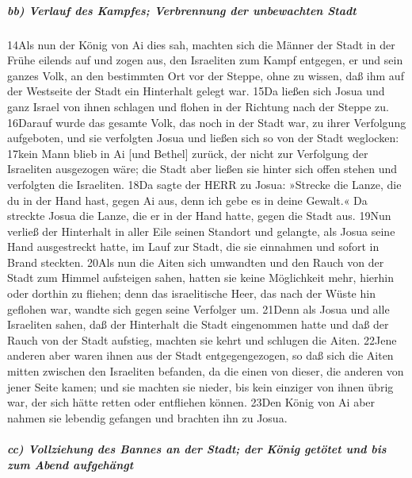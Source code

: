 \hypertarget{bb-verlauf-des-kampfes-verbrennung-der-unbewachten-stadt}{%
\subparagraph{bb) Verlauf des Kampfes; Verbrennung der unbewachten
Stadt}\label{bb-verlauf-des-kampfes-verbrennung-der-unbewachten-stadt}}

14Als nun der König von Ai dies sah, machten sich die Männer der Stadt
in der Frühe eilends auf und zogen aus, den Israeliten zum Kampf
entgegen, er und sein ganzes Volk, an den bestimmten Ort vor der Steppe,
ohne zu wissen, daß ihm auf der Westseite der Stadt ein Hinterhalt
gelegt war. 15Da ließen sich Josua und ganz Israel von ihnen schlagen
und flohen in der Richtung nach der Steppe zu. 16Darauf wurde das
gesamte Volk, das noch in der Stadt war, zu ihrer Verfolgung aufgeboten,
und sie verfolgten Josua und ließen sich so von der Stadt weglocken:
17kein Mann blieb in Ai {[}und Bethel{]} zurück, der nicht zur
Verfolgung der Israeliten ausgezogen wäre; die Stadt aber ließen sie
hinter sich offen stehen und verfolgten die Israeliten. 18Da sagte der
HERR zu Josua: »Strecke die Lanze, die du in der Hand hast, gegen Ai
aus, denn ich gebe es in deine Gewalt.« Da streckte Josua die Lanze, die
er in der Hand hatte, gegen die Stadt aus. 19Nun verließ der Hinterhalt
in aller Eile seinen Standort und gelangte, als Josua seine Hand
ausgestreckt hatte, im Lauf zur Stadt, die sie einnahmen und sofort in
Brand steckten. 20Als nun die Aiten sich umwandten und den Rauch von der
Stadt zum Himmel aufsteigen sahen, hatten sie keine Möglichkeit mehr,
hierhin oder dorthin zu fliehen; denn das israelitische Heer, das nach
der Wüste hin geflohen war, wandte sich gegen seine Verfolger um. 21Denn
als Josua und alle Israeliten sahen, daß der Hinterhalt die Stadt
eingenommen hatte und daß der Rauch von der Stadt aufstieg, machten sie
kehrt und schlugen die Aiten. 22Jene anderen aber waren ihnen aus der
Stadt entgegengezogen, so daß sich die Aiten mitten zwischen den
Israeliten befanden, da die einen von dieser, die anderen von jener
Seite kamen; und sie machten sie nieder, bis kein einziger von ihnen
übrig war, der sich hätte retten oder entfliehen können. 23Den König von
Ai aber nahmen sie lebendig gefangen und brachten ihn zu Josua.

\hypertarget{cc-vollziehung-des-bannes-an-der-stadt-der-kuxf6nig-getuxf6tet-und-bis-zum-abend-aufgehuxe4ngt}{%
\subparagraph{cc) Vollziehung des Bannes an der Stadt; der König getötet
und bis zum Abend
aufgehängt}\label{cc-vollziehung-des-bannes-an-der-stadt-der-kuxf6nig-getuxf6tet-und-bis-zum-abend-aufgehuxe4ngt}}

